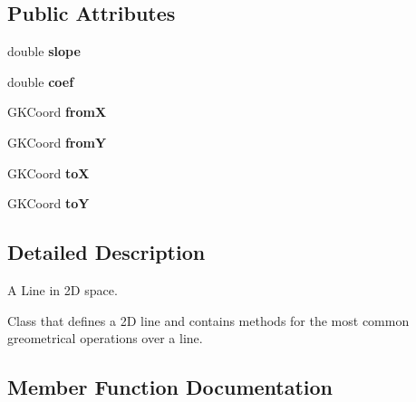\subsection*{Public Attributes}
\begin{DoxyCompactItemize}
\item 
double {\bfseries slope}\hypertarget{classGKLine_a9d938df4f4ca0b93e51dbf522711f6ee}{}\label{classGKLine_a9d938df4f4ca0b93e51dbf522711f6ee}

\item 
double {\bfseries coef}\hypertarget{classGKLine_a6e6eb41ac043baeab308ea18e2d90048}{}\label{classGKLine_a6e6eb41ac043baeab308ea18e2d90048}

\item 
G\+K\+Coord {\bfseries fromX}\hypertarget{classGKLine_a4c7a7f29224c051a86667068a6c6e0f0}{}\label{classGKLine_a4c7a7f29224c051a86667068a6c6e0f0}

\item 
G\+K\+Coord {\bfseries fromY}\hypertarget{classGKLine_a558a30d1bb96c52ea56d467aa7a4d57b}{}\label{classGKLine_a558a30d1bb96c52ea56d467aa7a4d57b}

\item 
G\+K\+Coord {\bfseries toX}\hypertarget{classGKLine_adc527d9e6624fa83127b508f189393c9}{}\label{classGKLine_adc527d9e6624fa83127b508f189393c9}

\item 
G\+K\+Coord {\bfseries toY}\hypertarget{classGKLine_acf17667c1d63a53afce2b9184259de49}{}\label{classGKLine_acf17667c1d63a53afce2b9184259de49}

\end{DoxyCompactItemize}


\subsection{Detailed Description}
A Line in 2D space. 

Class that defines a 2D line and contains methods for the most common greometrical operations over a line. 

\subsection{Member Function Documentation}
